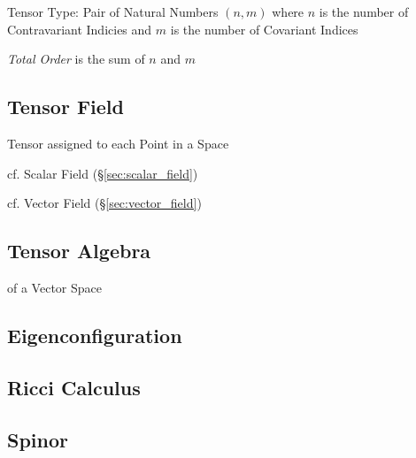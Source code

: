 Tensor Type: Pair of Natural Numbers $(n,m)$ where $n$ is the number
of Contravariant Indicies and $m$ is the number of Covariant Indices

\emph{Total Order} is the sum of $n$ and $m$



\subsection{Tensor Field}\label{sec:tensor_field}

Tensor assigned to each Point in a Space

cf. Scalar Field (\S\ref{sec:scalar_field})

cf. Vector Field (\S\ref{sec:vector_field})



\subsection{Tensor Algebra}\label{sec:tensor_algebra}

of a Vector Space



\subsection{Eigenconfiguration}\label{sec:eigenconfiguration}

\subsection{Ricci Calculus}\label{sec:ricci_calculus}

\subsection{Spinor}\label{sec:spinor}



